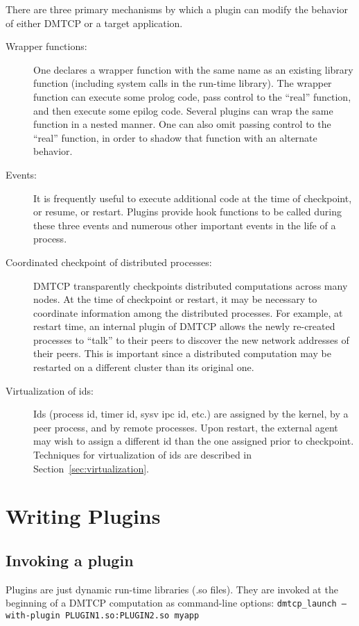 \documentclass{article}
\begin{document}
There are three primary mechanisms by which a plugin can modify the
behavior of either DMTCP or a target application.
\begin{description}
\item[Wrapper functions:]  One declares a wrapper function with the same
	name as an existing library function (including system calls in
	the run-time library).  The wrapper function can execute some
	prolog code, pass control to the ``real'' function,
	and then execute some epilog code.  Several plugins can wrap
	the same function in a nested manner.  One can also omit
	passing control to the ``real'' function, in order to shadow
	that function with an alternate behavior.
\item[Events:]  It is frequently useful to execute additional code
	at the time of checkpoint, or resume, or restart.  Plugins
	provide hook functions	to be called during these three events
	and numerous other important events in the life of a process.
\item[Coordinated checkpoint of distributed processes:]  DMTCP transparently
	checkpoints distributed computations across many nodes.
	At the time of checkpoint or restart, it may be necessary to
	coordinate information among the distributed processes.  For example,
	at restart time, an internal plugin of DMTCP allows the newly
	re-created processes to ``talk'' to their peers to discover the
	new network addresses of their peers.  This is important since
	a distributed computation may be restarted on a different cluster
	than its original one.
\item[Virtualization of ids:]  Ids (process id, timer id, sysv ipc id, etc.)
	are assigned by the kernel, by a peer process, and by remote processes.
	Upon restart, the external agent may wish to assign a different
	id than the one assigned prior to checkpoint.  Techniques for
	virtualization of ids are described in Section~\ref{sec:virtualization}.
\end{description}

\section{Writing Plugins}

\subsection{Invoking a plugin}

Plugins are just dynamic run-time libraries (.so files).  They are
invoked at the beginning of a DMTCP computation as command-line options:
\hfill\break
\medskip\noindent
  \hspace{0.3truein} {\tt dmtcp\_launch --with-plugin PLUGIN1.so:PLUGIN2.so myapp}
\medskip
\end{document}
